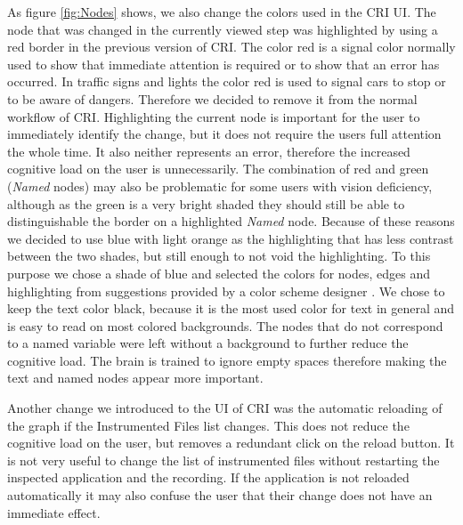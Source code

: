 As figure \ref{fig:Nodes} shows, we also change the colors used in the CRI UI. The node that was changed in the currently viewed step was highlighted by using a red border in the previous version of CRI. The color red is a signal color normally used to show that immediate attention is required or to show that an error has occurred. In traffic signs and lights the color red is used to signal cars to stop or to be aware of dangers. Therefore we decided to remove it from the normal workflow of CRI. Highlighting the current node is important for the user to immediately identify the change, but it does not require the users full attention the whole time. It also neither represents an error, therefore the increased cognitive load on the user is unnecessarily. The combination of red and green (\emph{Named} nodes) may also be problematic for some users with vision deficiency, although as the green is a very bright shaded they should still be able to distinguishable the border on a highlighted \emph{Named} node. Because of these reasons we decided to use blue with light orange as the highlighting that has less contrast between the two shades, but still enough to not void the highlighting. To this purpose we chose a shade of blue and selected the colors for nodes, edges and highlighting from suggestions provided by a color scheme designer \cite{Paletton}. We chose to keep the text color black, because it is the most used color for text in general and is easy to read on most colored backgrounds. The nodes that do not correspond to a named variable were left without a background to further reduce the cognitive load. The brain is trained to ignore empty spaces therefore making the text and named nodes appear more important.

Another change we introduced to the UI of CRI was the automatic reloading of the graph if the Instrumented Files list changes. This does not reduce the cognitive load on the user, but removes a redundant click on the reload button. It is not very useful to change the list of instrumented files without restarting the inspected application and the recording. If the application is not reloaded automatically it may also confuse the user that their change does not have an immediate effect. 
	
